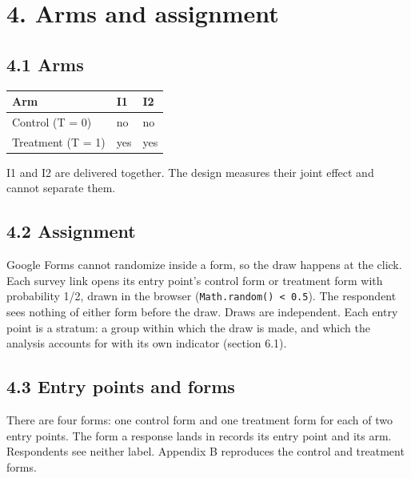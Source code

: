 \section{4. Arms and assignment}\label{arms-and-assignment}

\subsection{4.1 Arms}\label{arms}

{\def\LTcaptype{none} %
\begin{longtable}[]{@{}lll@{}}
\toprule\noalign{}
Arm & I1 & I2 \\
\midrule\noalign{}
\endhead
\bottomrule\noalign{}
\endlastfoot
Control (T = 0) & no & no \\
Treatment (T = 1) & yes & yes \\
\end{longtable}
}

I1 and I2 are delivered together. The design measures their joint effect and cannot separate them.

\subsection{4.2 Assignment}\label{assignment}

Google Forms cannot randomize inside a form, so the draw happens at the click. Each survey link
opens its entry point's control form or treatment form with probability 1/2, drawn in the browser (\texttt{Math.random()\ \textless{}\ 0.5}). The respondent sees nothing of either form before the draw. Draws are independent. Each entry point is a stratum: a group within which the draw is made, and which the analysis accounts for with its own indicator (section 6.1).

\subsection{4.3 Entry points and forms}\label{entry-points-and-forms}

There are four forms: one control form and one treatment form for each of two entry points. The form a response lands in records its entry point and its arm. Respondents see neither label. Appendix B reproduces the control and treatment forms.

